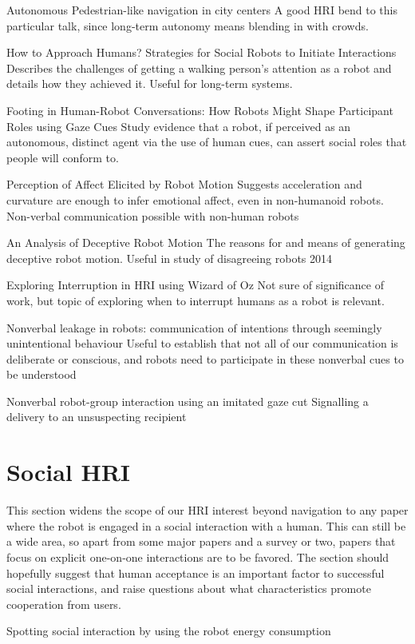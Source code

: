 \documentclass{sfuthesis}
\begin{document}
Autonomous Pedestrian-like navigation in city centers	A good HRI bend to this particular talk, since long-term autonomy means blending in with crowds.	

How to Approach Humans? Strategies for Social Robots to Initiate Interactions	Describes the challenges of getting a walking person's attention as a robot and details how they achieved it. Useful for long-term systems.	

Footing in Human-Robot Conversations: How Robots Might Shape Participant Roles using Gaze Cues	Study evidence that a robot, if perceived as an autonomous, distinct agent via the use of human cues, can assert social roles that people will conform to.	

Perception of Affect Elicited by Robot Motion	Suggests acceleration and curvature are enough to infer emotional affect, even in non-humanoid robots. Non-verbal communication possible with non-human robots	

An Analysis of Deceptive Robot Motion	The reasons for and means of generating deceptive robot motion. Useful in study of disagreeing robots	2014

Exploring Interruption in HRI using Wizard of Oz	Not sure of significance of work, but topic of exploring when to interrupt humans as a robot is relevant.	

Nonverbal leakage in robots: communication of intentions through seemingly unintentional behaviour	Useful to establish that not all of our communication is deliberate or conscious, and robots need to participate in these nonverbal cues to be understood	

Nonverbal robot-group interaction using an imitated gaze cut	Signalling a delivery to an unsuspecting recipient


\section{Social HRI}

This section widens the scope of our HRI interest beyond navigation to any paper where the robot is engaged in a social interaction with a human. This can still be a wide area, so apart from some major papers and a survey or two, papers that focus on explicit one-on-one interactions are to be favored. The section should hopefully suggest that human acceptance is an important factor to successful social interactions, and raise questions about what characteristics promote cooperation from users.

Spotting social interaction by using the robot energy consumption
\end{document}
